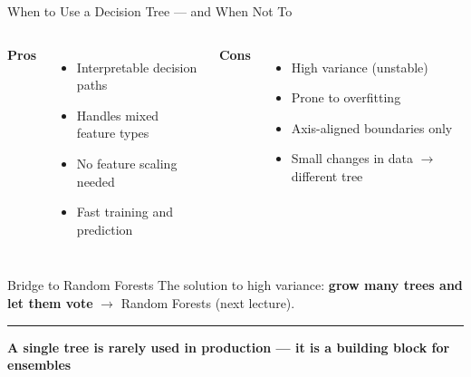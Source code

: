 \documentclass[8pt,aspectratio=169]{beamer}
\newcommand{\bottomnote}[1]{%
\vfill
\vspace{-2mm}
\textcolor{mllavender2}{\rule{\textwidth}{0.4pt}}
\vspace{1mm}
\footnotesize
\textbf{#1}
}
\newenvironment{compactlist}{%
  \begin{itemize}%
    \setlength{\itemsep}{2pt}%
    \setlength{\parskip}{0pt}%
    \setlength{\parsep}{0pt}%
}{%
  \end{itemize}%
}
\newcommand{\highlight}[1]{\textcolor{mlorange}{\textbf{#1}}}
\begin{document}
\begin{frame}[t]{When to Use a Decision Tree --- and When Not To}
\small
\begin{columns}[T]
\textbf{\textcolor{mlgreen}{Pros}}
\begin{compactlist}
\item \footnotesize Interpretable decision paths
\item \footnotesize Handles mixed feature types
\item \footnotesize No feature scaling needed
\item \footnotesize Fast training and prediction
\end{compactlist}

\textbf{\textcolor{dfred}{Cons}}
\begin{compactlist}
\item \footnotesize High variance (unstable)
\item \footnotesize Prone to overfitting
\item \footnotesize Axis-aligned boundaries only
\item \footnotesize Small changes in data $\to$ different tree
\end{compactlist}
\end{columns}

\vspace{3mm}
\begin{block}{Bridge to Random Forests}
\footnotesize The solution to high variance: \highlight{grow many trees and let them vote} $\to$ Random Forests (next lecture).
\end{block}
\bottomnote{A single tree is rarely used in production --- it is a building block for ensembles}
\end{frame}
\end{document}
